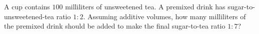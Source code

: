 A cup contains $100$ milliliters of unsweetened tea. A premixed drink has sugar-to-unsweetened-tea ratio $1:2$. Assuming additive volumes, how many milliliters of the premixed drink should be added to make the final sugar-to-tea ratio $1:7$?
